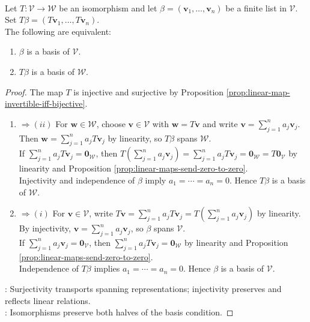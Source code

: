 \begin{proposition} \label{prop:isomorphisms-preserve-bases} \\
Let $T:\mathcal{V}\to\mathcal{W}$ be an isomorphism and let $\beta=(\mathbf{v}_1,\ldots,\mathbf{v}_n)$ be a finite list in $\mathcal{V}$. Set $T\beta=(T\mathbf{v}_1,\ldots,T\mathbf{v}_n)$.\\
The following are equivalent:
\begin{enumerate}[label=(\roman*)]
\setlength{\itemsep}{0pt}
\item $\beta$ is a basis of $\mathcal{V}$.
\item $T\beta$ is a basis of $\mathcal{W}$.
\end{enumerate}
\begin{proof}
The map $T$ is injective and surjective by Proposition \ref{prop:linear-map-invertible-iff-bijective}.
\begin{enumerate}[label=(\roman*)]
\setlength{\itemsep}{0pt}
\item[$(i)$] $\Rightarrow (ii)$ For $\mathbf{w}\in\mathcal{W}$, choose $\mathbf{v}\in\mathcal{V}$ with $\mathbf{w}=T\mathbf{v}$ and write $\mathbf{v}=\sum\limits_{j=1}^{n}a_j\mathbf{v}_j$. Then $\mathbf{w}=\sum\limits_{j=1}^{n}a_jT\mathbf{v}_j$ by linearity, so $T\beta$ spans $\mathcal{W}$.\\
If $\sum\limits_{j=1}^{n}a_jT\mathbf{v}_j=\mathbf{0}_{\mathcal{W}}$, then $T(\sum\limits_{j=1}^{n}a_j\mathbf{v}_j)=\sum\limits_{j=1}^{n}a_jT\mathbf{v}_j=\mathbf{0}_{\mathcal{W}}=T\mathbf{0}_{\mathcal{V}}$ by linearity and Proposition \ref{prop:linear-maps-send-zero-to-zero}.\\
Injectivity and independence of $\beta$ imply $a_1=\cdots=a_n=0$. Hence $T\beta$ is a basis of $\mathcal{W}$.
\item[$(ii)$] $\Rightarrow (i)$ For $\mathbf{v}\in\mathcal{V}$, write $T\mathbf{v}=\sum\limits_{j=1}^{n}a_jT\mathbf{v}_j=T(\sum\limits_{j=1}^{n}a_j\mathbf{v}_j)$ by linearity. By injectivity, $\mathbf{v}=\sum\limits_{j=1}^{n}a_j\mathbf{v}_j$, so $\beta$ spans $\mathcal{V}$.\\
If $\sum\limits_{j=1}^{n}a_j\mathbf{v}_j=\mathbf{0}_{\mathcal{V}}$, then $\sum\limits_{j=1}^{n}a_jT\mathbf{v}_j=\mathbf{0}_{\mathcal{W}}$ by linearity and Proposition \ref{prop:linear-maps-send-zero-to-zero}.\\
Independence of $T\beta$ implies $a_1=\cdots=a_n=0$. Hence $\beta$ is a basis of $\mathcal{V}$.
\end{enumerate}
: Surjectivity transports spanning representations; injectivity preserves and reflects linear relations.\\
: Isomorphisms preserve both halves of the basis condition.
\end{proof}
\end{proposition}


